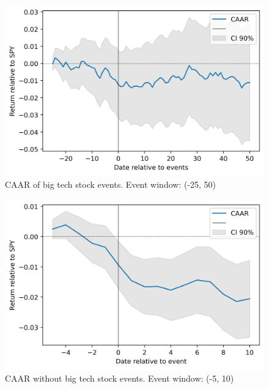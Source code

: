 \begin{figure}[h]
  \centering
  \includegraphics[width=1\textwidth]{figures/esBigCapLong.png}
  \caption{CAAR of big tech stock events. Event window: (-25, 50)}
  \label{fig:esBigCapLong}
\end{figure}

\begin{figure}[h]
  \centering
  \includegraphics[width=1\textwidth]{figures/esnoBigCap.png}
  \caption{CAAR without big tech stock events. Event window: (-5, 10)}
  \label{fig:esnoBigCap}
\end{figure}


